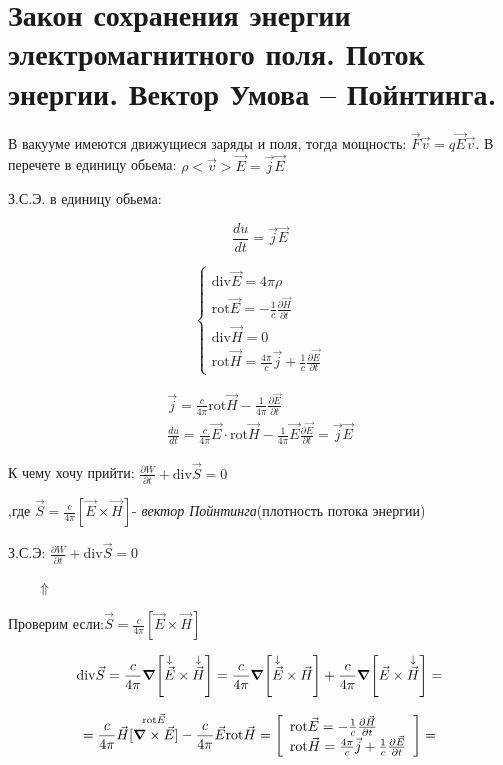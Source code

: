 \section{Закон сохранения энергии электромагнитного поля. Поток энергии. Вектор
Умова – Пойнтинга.}

В вакууме имеются движущиеся заряды и поля, тогда мощность: \( \vec{F}\vec{v}=q\vec{E}\vec{v} \). В перечете в единицу обьема: \( \rho <\vec{v}>\vec{E}=\vec{j}\vec{E} \) 

З.С.Э. в единицу обьема:

\[
\frac{du}{dt}=\vec{j}\vec{E}
\]

\[
\begin{cases}
    \mathrm{div}\vec{E}=4\pi\rho \\
    \mathrm{rot}\vec{E}=-\frac{1}{c} \frac{\partial\vec{H}}{\partial t} \\
    \mathrm{div}\vec{H}=0 \\
    \mathrm{rot}\vec{H}=\frac{4\pi}{c}\vec{j}+\frac{1}{c} \frac{\partial\vec{E}}{\partial t}         
\end{cases}
\]

\begin{gather*}
    \vec{j}=\frac{c}{4\pi}\mathrm{rot}\vec{H}-\frac{1}{4\pi} \frac{\partial \vec{E}}{\partial t} \\
    \frac{du}{dt}=\frac{c}{4\pi}\vec{E}\cdot\mathrm{rot}\vec{H}-\frac{1}{4\pi}\vec{E}\frac{\partial\vec{E}}{\partial t} = \vec{j} \vec{ E}         
\end{gather*}

К чему хочу прийти: \( \frac{\partial W}{\partial t}+\mathrm{div}\vec{S}=0   \) 

,где \( \boxed{\vec{S}=\frac{c}{4\pi}[\vec{E}\times \vec{H}] } \)- \textit{вектор Пойнтинга}(плотность потока энергии)

З.С.Э: \( \frac{\partial W}{\partial t} +\mathrm{div}\vec{S}=0  \)

\(\qquad    \Uparrow\)

Проверим если:\(\vec{S}=\frac{c}{4\pi}[\vec{E}\times \vec{H}] \)

\[
\mathrm{div}\vec{S}=\frac{c}{4\pi}\grad [\overset{\downarrow}{\vec{E}}\times\overset{\downarrow}{\vec{H}} ]=\frac{c}{4\pi}\grad [\overset{\downarrow}{\vec{E}}\times \vec{H}]+\frac{c}{4\pi}\grad[\vec{E}\times \overset{\downarrow}{\vec{H}}]=     
\]

\[
=\frac{c}{4\pi}\vec{H}[\overset{\mathrm{rot}\vec{E} }{\grad \times \vec{E}}]-\frac{c}{4\pi}\vec{E} \mathrm{rot}\vec{H}=
\left[ 
    \begin{array}{ll}
        \mathrm{rot}\vec{E}=-\frac{1}{c}\frac{\partial\vec{H}}{\partial t} \\
        \mathrm{rot}\vec{H}=\frac{4\pi}{c}\vec{j}+\frac{1}{c}\frac{\partial\vec{E}}{\partial t}       
    \end{array} 
\right]=
\]

